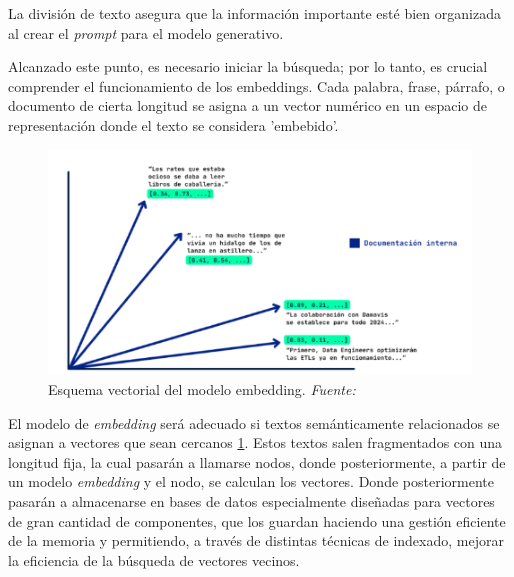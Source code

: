 \bigskip %

La división de texto asegura que la información importante esté bien organizada al crear el \textit{prompt} para el modelo generativo.

\bigskip %

Alcanzado este punto, es necesario iniciar la búsqueda; por lo tanto, es crucial comprender el funcionamiento de los \gls{embeddings}. Cada palabra, frase, párrafo, o documento de cierta longitud se asigna a un vector numérico en un espacio de representación donde el texto se considera 'embebido'.

\bigskip %

\begin{figure}[htbp!]
  \centering
  \includegraphics[width=\textwidth,keepaspectratio]{imaxes/5_RAG_Embeddingpng.png}
  \caption[Esquema vectorial del modelo embedding]{Esquema vectorial del modelo embedding. \textit{Fuente: \cite{embedding}}}
  \label{fig:5_RAG_Embedding}
\end{figure}


\bigskip %

El modelo de \textit{embedding} será adecuado si textos semánticamente relacionados se asignan a vectores que sean cercanos \ref{fig:5_RAG_Embedding}. Estos textos salen fragmentados con una longitud fija, la cual pasarán a llamarse nodos, donde posteriormente, a partir de un modelo \textit{embedding} y el nodo, se calculan los vectores. Donde posteriormente pasarán a almacenarse en bases de datos especialmente diseñadas para vectores de gran cantidad de componentes, que los guardan haciendo una gestión eficiente de la memoria y permitiendo, a través de distintas técnicas de indexado, mejorar la eficiencia de la búsqueda de vectores vecinos.

